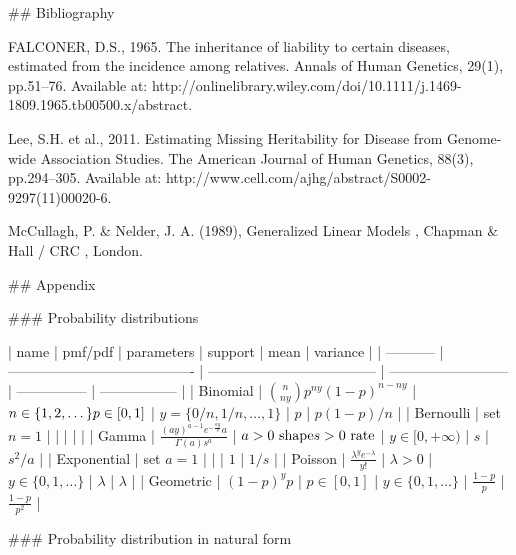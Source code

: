 \documentclass{TMarticle}
\begin{document}
## Bibliography

FALCONER, D.S., 1965. The inheritance of liability to certain diseases, estimated from the incidence among relatives. Annals of Human Genetics, 29(1), pp.51–76. Available at: http://onlinelibrary.wiley.com/doi/10.1111/j.1469-1809.1965.tb00500.x/abstract.

Lee, S.H. et al., 2011. Estimating Missing Heritability for Disease from Genome-wide Association Studies. The American Journal of Human Genetics, 88(3), pp.294–305. Available at: http://www.cell.com/ajhg/abstract/S0002-9297(11)00020-6.

McCullagh, P. & Nelder, J. A. (1989), Generalized Linear Models , Chapman & Hall / CRC , London.

## Appendix

### Probability distributions

| name        | pmf/pdf                                  | parameters                           | support                    | mean            | variance          |
| ----------- | ---------------------------------------- | ------------------------------------ | -------------------------- | --------------- | ----------------- |
| Binomial    | ${n \choose ny} p^{ny}(1-p)^{n-ny}$      | $n\in \{1, 2, \dots\}\\p\in[0,1]$    | $y=\{0/n, 1/n, \dots, 1\}$ | $p$             | $p(1-p)/n$        |
| Bernoulli   | set $n=1$                                |                                      |                            |                 |                   |
| Gamma       | $\frac{(ay)^{a-1} e^{-\frac{ay}{s}} a}{\Gamma(a)s^a}$ | $a>0\text{ shape}\\s>0 \text{ rate}$ | $y \in [0, +\infty)$       | $s$             | $s^2/a$           |
| Exponential | set $a=1$                                |                                      |                            | $1$             | $1/s$             |
| Poisson     | $\frac{\lambda^y e^{-\lambda}}{y!}$      | $\lambda > 0$                        | $y \in \{0, 1, \dots\}$    | $\lambda$       | $\lambda$         |
| Geometric   | $(1-p)^y p$                              | $p\in[0,1]$                          | $y \in \{0, 1, \dots\}$    | $\frac{1-p}{p}$ | $\frac{1-p}{p^2}$ |

### Probability distribution in natural form
\end{document}
